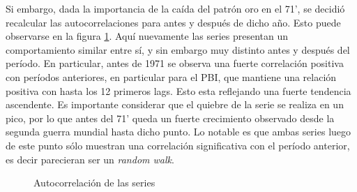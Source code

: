 \documentclass[a4paper]{article}
\begin{document}
Si embargo, dada la importancia de la caída del patrón oro en el 71', se decidió recalcular las autocorrelaciones para antes y después de dicho año. Esto puede observarse en la figura \ref{fig:autocorrelacion_grp}. Aquí nuevamente las series presentan un comportamiento similar entre sí, y sin embargo muy distinto antes y después del período. En particular, antes de 1971 se observa una fuerte correlación positiva con períodos anteriores, en particular para el PBI, que mantiene una relación positiva con hasta los 12 primeros lags. Esto esta reflejando una fuerte tendencia ascendente. Es importante considerar que el quiebre de la serie se realiza en un pico, por lo que antes del 71' queda un fuerte crecimiento observado desde la segunda guerra mundial hasta dicho punto. Lo notable es que ambas series luego de este punto sólo muestran una correlación significativa con el período anterior, es decir parecieran ser un \textit{random walk}.


\begin{figure}[H]
	\centering
	\caption{Autocorrelación de las series} \label{fig:autocorrelacion_grp}
\end{figure}
\end{document}
